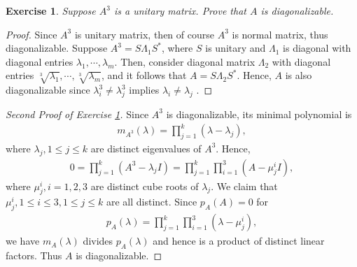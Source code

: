 \documentclass[11pt]{book}
\newtheorem{exercise}{Exercise}[section]
\theoremstyle{definition}
\numberwithin{equation}{chapter}
\begin{document}
\begin{exercise}\label{exercise_16627}
Suppose $A^3$ is a unitary matrix. Prove that $A$ is diagonalizable.
\end{exercise}
\begin{proof}
Since $A^3$ is unitary matrix, then of course $A^3$ is normal matrix, thus diagonalizable. Suppose $A^3 = S \Lambda_1 S^*$, where $S$ is unitary and $\Lambda_1$ is diagonal with diagonal entries $\lambda_1, \cdots, \lambda_m$. Then, consider diagonal matrix $\Lambda_2$ with diagonal entries $\sqrt[3]{\lambda_1}, \cdots, \sqrt[3]{\lambda_m}$, and it follows that $A = S \Lambda_2 S^*$. Hence, $A$ is also diagonalizable since $\lambda_i^3 \neq \lambda_j^3$ implies $\lambda_i \neq \lambda_j$ \cite{22}.
\end{proof}

\medskip

\begin{proof}[Second Proof of Exercise \ref{exercise_16627}]
Since $A^3$ is diagonalizable, its minimal polynomial is
\begin{align*}
    m_{A^3}(\lambda) = \prod^k_{j=1} (\lambda - \lambda_j),
\end{align*}
where $\lambda_j, 1 \leq j \leq k$ are distinct eigenvalues of $A^3$. Hence, 
\begin{align*}
    0 = \prod^k_{j=1} \left(A^3 - \lambda_j I\right) = \prod^k_{j=1} \prod^3_{i=1} \left(A - \mu^i_j I\right),
\end{align*}
where $\mu^i_j, i = 1,2,3$ are distinct cube roots of $\lambda_j$. We claim that $\mu^i_j, 1 \leq i \leq 3, 1 \leq j \leq k$ are all distinct. Since $p_A(A) = 0$ for
\begin{align*}
    p_A(\lambda) = \prod^k_{j=1} \prod^3_{i=1} \left(\lambda - \mu^i_j\right),
\end{align*}
we have $m_A(\lambda)$ divides $p_A(\lambda)$ and hence is a product of distinct linear factors. Thus $A$ is diagonalizable.
\end{proof}

\medskip
\end{document}
